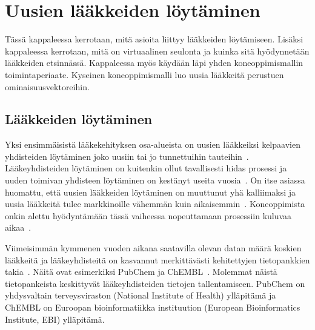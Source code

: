 \documentclass[finnish,twoside,censored,tkt,sw-line]{HYthesisML}
\begin{document}
\chapter{Uusien lääkkeiden löytäminen}


Tässä kappaleessa kerrotaan, mitä asioita liittyy lääkkeiden löytämiseen.
Lisäksi kappaleessa kerrotaan, mitä on virtuaalinen seulonta ja kuinka sitä hyödynnetään lääkkeiden etsinnässä.
Kappaleessa myös käydään läpi yhden koneoppimismallin toimintaperiaate.
Kyseinen koneoppimismalli luo uusia lääkkeitä perustuen ominaisuusvektoreihin.

\section{Lääkkeiden löytäminen}

Yksi ensimmäisistä lääkekehityksen osa-alueista on uusien lääkkeiksi kelpaavien yhdisteiden löytäminen joko uusiin tai jo tunnettuihin tauteihin~\cite{EkinsSean2019Emlf}.
Lääkeyhdisteiden löytäminen on kuitenkin ollut tavallisesti hidas prosessi ja uuden toimivan yhdisteen löytäminen on kestänyt useita vuosia~\cite{EkinsSean2019Emlf,MunosBernardH2011Htrb}.
On itse asiassa huomattu, että uusien lääkkeiden löytäminen on muuttunut yhä kalliimaksi ja uusia lääkkeitä tulee markkinoille vähemmän kuin aikaisemmin~\cite{MunosBernardH2011Htrb}.
Koneoppimista onkin alettu hyödyntämään tässä vaiheessa nopeuttamaan prosessiin kuluvaa aikaa~\cite{VamathevanJessica2019Aoml}.

Viimeisimmän kymmenen vuoden aikana saatavilla olevan datan määrä koskien lääkkeitä ja lääkeyhdisteitä on kasvannut merkittävästi kehitettyjen tietopankkien takia~\cite{EkinsSean2019Emlf}.
Näitä ovat esimerkiksi PubChem ja ChEMBL~\cite{NationalCenterForBiotechnologyInformation,chembl}.
Molemmat näistä tietopankeista keskittyvät lääkeyhdisteiden tietojen tallentamiseen.
PubChem on yhdysvaltain terveysviraston (National Institute of Health) ylläpitämä ja ChEMBL on Euroopan bioinformatiikka instituution (European Bioinformatics Institute, EBI) ylläpitämä.


\end{document}
